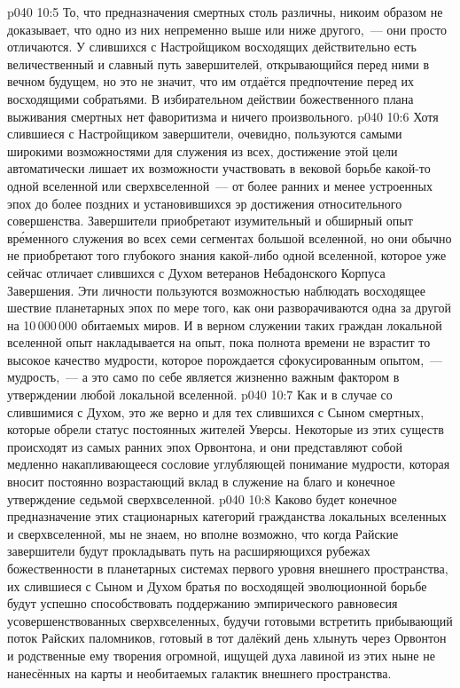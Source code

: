 \vs p040 10:5 \pc То, что предназначения смертных столь различны, никоим образом не доказывает, что одно из них непременно выше или ниже другого,~--- они просто отличаются. У слившихся с Настройщиком восходящих действительно есть величественный и славный путь завершителей, открывающийся перед ними в вечном будущем, но это не значит, что им отдаётся предпочтение перед их восходящими собратьями. В избирательном действии божественного плана выживания смертных нет фаворитизма и ничего произвольного.
\vs p040 10:6 \pc Хотя слившиеся с Настройщиком завершители, очевидно, пользуются самыми широкими возможностями для служения из всех, достижение этой цели автоматически лишает их возможности участвовать в вековой борьбе какой-то одной вселенной или сверхвселенной~--- от более ранних и менее устроенных эпох до более поздних и установившихся эр достижения относительного совершенства. Завершители приобретают изумительный и обширный опыт вр\'еменного служения во всех семи сегментах большой вселенной, но они обычно не приобретают того глубокого знания какой-либо одной вселенной, которое уже сейчас отличает слившихся с Духом ветеранов Небадонского Корпуса Завершения. Эти личности пользуются возможностью наблюдать восходящее шествие планетарных эпох по мере того, как они разворачиваются одна за другой на 10\,000\,000 обитаемых миров. И в верном служении таких граждан локальной вселенной опыт накладывается на опыт, пока полнота времени не взрастит то высокое качество мудрости, которое порождается сфокусированным опытом,~---  мудрость,~--- а это само по себе является жизненно важным фактором в утверждении любой локальной вселенной.
\vs p040 10:7 Как и в случае со слившимися с Духом, это же верно и для тех слившихся с Сыном смертных, которые обрели статус постоянных жителей Уверсы. Некоторые из этих существ происходят из самых ранних эпох Орвонтона, и они представляют собой медленно накапливающееся сословие углубляющей понимание мудрости, которая вносит постоянно возрастающий вклад в служение на благо и конечное утверждение седьмой сверхвселенной.
\vs p040 10:8 \pc Каково будет конечное предназначение этих стационарных категорий гражданства локальных вселенных и сверхвселенной, мы не знаем, но вполне возможно, что когда Райские завершители будут прокладывать путь на расширяющихся рубежах божественности в планетарных системах первого уровня внешнего пространства, их слившиеся с Сыном и Духом братья по восходящей эволюционной борьбе будут успешно способствовать поддержанию эмпирического равновесия усовершенствованных сверхвселенных, будучи готовыми встретить прибывающий поток Райских паломников, готовый в тот далёкий день хлынуть через Орвонтон и родственные ему творения огромной, ищущей духа лавиной из этих ныне не нанесённых на карты и необитаемых галактик внешнего пространства.
